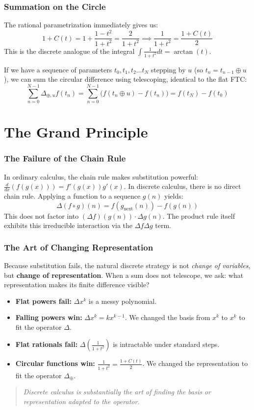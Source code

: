 \documentclass[12pt]{article}
\newcommand{\next}[1]{#1_{\text{next}}}
\newcommand{\falling}[2]{{#1}^{\underline{#2}}}
\begin{document}
\section{Summation on the Circle}

The rational parametrization immediately gives us:
\[ 1 + C(t) = 1 + \frac{1-t^2}{1+t^2} = \frac{2}{1+t^2} \implies \frac{1}{1+t^2} = \frac{1+C(t)}{2} \]
This is the discrete analogue of the integral $\int \frac{1}{1+t^2} dt = \arctan(t)$. 

If we have a sequence of parameters $t_0, t_1, t_2 \dots t_N$ stepping by $u$ (so $t_{n} = t_{n-1} \oplus u$), we can sum the circular difference using telescoping, identical to the flat FTC:
\[ \sum_{n=0}^{N-1} \Delta_{\oplus, u} f(t_n) = \sum_{n=0}^{N-1} \big( f(t_n \oplus u) - f(t_n) \big) = f(t_N) - f(t_0) \]

\part{The Grand Principle}

\section{The Failure of the Chain Rule}

In ordinary calculus, the chain rule makes substitution powerful: $\frac{d}{dx}(f(g(x))) = f'(g(x))g'(x)$. 
In discrete calculus, there is no direct chain rule. Applying a function to a sequence $g(n)$ yields:
\[ \Delta(f \circ g)(n) = f(\next{g}(n)) - f(g(n)) \]
This does not factor into $(\Delta f)(g(n)) \cdot \Delta g(n)$. The product rule itself exhibits this irreducible interaction via the $\Delta f \Delta g$ term.

\section{The Art of Changing Representation}

Because substitution fails, the natural discrete strategy is not \textit{change of variables}, but \textbf{change of representation}. When a sum does not telescope, we ask: what representation makes its finite difference visible?

\begin{itemize}
    \item \textbf{Flat powers fail:} $\Delta x^k$ is a messy polynomial.
    \item \textbf{Falling powers win:} $\Delta \falling{x}{k} = k \falling{x}{k-1}$. We changed the basis from $x^k$ to $\falling{x}{k}$ to fit the operator $\Delta$.
    \item \textbf{Flat rationals fail:} $\Delta \left(\frac{1}{1+t^2}\right)$ is intractable under standard steps.
    \item \textbf{Circular functions win:} $\frac{1}{1+t^2} = \frac{1+C(t)}{2}$. We changed the representation to fit the operator $\Delta_{\oplus}$.
\end{itemize}

\begin{quote}
\textit{Discrete calculus is substantially the art of finding the basis or representation adapted to the operator.}
\end{quote}
\end{document}
